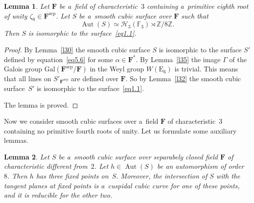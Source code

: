 \documentclass{amsart}
\numberwithin{equation}{section}
\theoremstyle{plain}
\newtheorem{lemma}{Lemma}
\theoremstyle{definition}
\theoremstyle{remark}
\begin{document}
\begin{lemma}
\label{l36}
Let $\mathbf{F}$ be a~field of characteristic~$3$ containing a~primitive eighth root of unity $\zeta_8 \in \mathbf{F}^{\mathrm{sep}}$. Let $S$ be a~smooth cubic surface over $\mathbf{F}$ such that
$$
\operatorname{Aut}(S) \simeq \mathcal{H}_3(\mathbb{F}_3) \rtimes \mathbb{Z}/8\mathbb{Z}.
$$
Then $S$ is isomorphic to the surface~\eqref{eq1.1}.
\end{lemma}

\begin{proof}
By Lemma~\ref{l30} the smooth cubic surface $S$ is isomorphic to the surface $S'$ defined by equation~\eqref{eq5.6} for some $\alpha \in \mathbf{F}^*$. By Lemma~\ref{l35} the image $\Gamma$ of the Galois group $\mathrm{Gal}(\mathbf{F}^{\mathrm{sep}}/\mathbf{F})$ in the Weyl group $W(\mathrm{E}_6)$ is trivial. This means that all lines on $S'_{\mathbf{F}^{\mathrm{sep}}}$ are defined over $\mathbf{F}$. So by Lemma~\ref{l32} the smooth cubic surface~$S'$ is isomorphic to the surface~\eqref{eq1.1}.

The lemma is proved.
\end{proof}

Now we consider smooth cubic surfaces over a~field $\mathbf{F}$ of characteristic~$3$ containing no primitive fourth roots of unity. Let us formulate some auxiliary lemmas.

\begin{lemma}
\label{l37}
Let $S$ be a~smooth cubic surface over separabely closed field $\mathbf{F}$ of characteristic different from~$2$. Let $h \in \operatorname{Aut}(S)$ be an automorphism of order~$8$. Then $h$ has three fixed points on~$S$. Moreover, the intersection of $S$ with the tangent planes at fixed points is a~cuspidal cubic curve for one of these points, and it is reducible for the other two.
\end{lemma}
\end{document}
